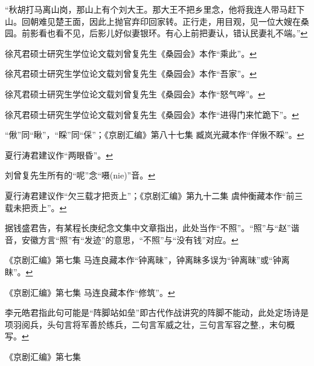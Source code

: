  ``秋胡打马离山岗，那山上有个刘大王。那大王不把乡里念，他将我连人带马赶下山。回朝难见楚王面，因此上抛官弃印回家转。正行走，用目观，见一位大嫂在桑园。前影看也看不见，后影儿好似妻银环。有心上前把妻认，错认民妻礼不端。''\protect\hyperlink{fnref85}{↩}
\item
  \leavevmode\hypertarget{fn86}{}%
  徐芃君硕士研究生学位论文载刘曾复先生《桑园会》本作``乘此''。\protect\hyperlink{fnref86}{↩}
\item
  \leavevmode\hypertarget{fn87}{}%
  徐芃君硕士研究生学位论文载刘曾复先生《桑园会》本作``吾家''。\protect\hyperlink{fnref87}{↩}
\item
  \leavevmode\hypertarget{fn88}{}%
  徐芃君硕士研究生学位论文载刘曾复先生《桑园会》本作``怒气哗''。\protect\hyperlink{fnref88}{↩}
\item
  \leavevmode\hypertarget{fn89}{}%
  徐芃君硕士研究生学位论文载刘曾复先生《桑园会》本作``进得门来忙跪下''。\protect\hyperlink{fnref89}{↩}
\item
  \leavevmode\hypertarget{fn90}{}%
  ``偢''同``瞅''，``睬''同``倸''；《京剧汇编》第八十七集
  臧岚光藏本作``佯愀不睬''。\protect\hyperlink{fnref90}{↩}
\item
  \leavevmode\hypertarget{fn91}{}%
  夏行涛君建议作``两眼昏''。\protect\hyperlink{fnref91}{↩}
\item
  \leavevmode\hypertarget{fn92}{}%
  刘曾复先生所有的``呢''念``嗫(nie)''音。\protect\hyperlink{fnref92}{↩}
\item
  \leavevmode\hypertarget{fn93}{}%
  夏行涛君建议作``欠三载才把贡上''；《京剧汇编》第九十二集
  虞仲衡藏本作``前三载未把贡上''。\protect\hyperlink{fnref93}{↩}
\item
  \leavevmode\hypertarget{fn94}{}%
  据钱盛君告，有某程长庚纪念文集中文章指出，此处当作``不照''。``照''与``赵''谐音，安徽方言``照''有``发迹''的意思，``不照''与``没有钱''对应。\protect\hyperlink{fnref94}{↩}
\item
  \leavevmode\hypertarget{fn95}{}%
  《京剧汇编》第七集
  马连良藏本作``钟离昧''，钟离眛多误为``钟离昧''或``钟离眜''。\protect\hyperlink{fnref95}{↩}
\item
  \leavevmode\hypertarget{fn96}{}%
  《京剧汇编》第七集
  马连良藏本作``修筑''。\protect\hyperlink{fnref96}{↩}
\item
  \leavevmode\hypertarget{fn97}{}%
  李元皓君指此句可能是``阵脚站如垒''即古代作战讲究的阵脚不能动，此处定场诗是项羽阅兵，头句言将军善於练兵，二句言军威之壮，三句言军容之整,，末句概写。\protect\hyperlink{fnref97}{↩}
\item
  \leavevmode\hypertarget{fn98}{}%
  《京剧汇编》第七集
